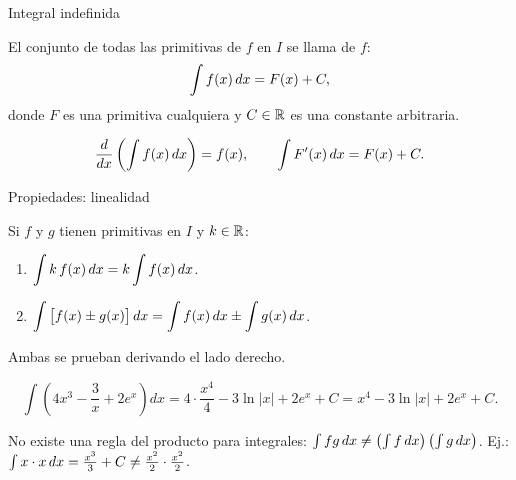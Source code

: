 \documentclass[10pt,aspectratio=169]{beamer}
\begin{document}
\begin{frame}{Integral indefinida}
  \begin{definicion}
    El conjunto de todas las primitivas de $f$ en $I$ se llama  de $f$:
    \[ \int f(x)\,dx = F(x)+C, \]
    donde $F$ es una primitiva cualquiera y $C\in\mathbb{R}$ es una constante arbitraria.
  \end{definicion}
  \begin{center}
  \end{center}
  \begin{proposicion}
    \[ \frac{d}{dx}\left(\int f(x)\,dx\right)=f(x),\qquad \int F'(x)\,dx=F(x)+C. \]
  \end{proposicion}
\end{frame}

\begin{frame}{Propiedades: linealidad}
  \begin{proposicion}
    Si $f$ y $g$ tienen primitivas en $I$ y $k\in\mathbb{R}$:
    \begin{enumerate}
      \item $\displaystyle\int k\,f(x)\,dx = k\int f(x)\,dx$.
      \item $\displaystyle\int \big[f(x)\pm g(x)\big]\,dx=\int f(x)\,dx\pm\int g(x)\,dx$.
    \end{enumerate}
  \end{proposicion}
  Ambas se prueban derivando el lado derecho.
  \begin{ejemplo}
    \[
      \int\left(4x^3-\frac{3}{x}+2e^x\right)dx
      = 4\cdot\frac{x^4}{4}-3\ln|x|+2e^x+C = x^4-3\ln|x|+2e^x+C.
    \]
  \end{ejemplo}
  \begin{observacion}
    \alert{No} existe una regla del producto para integrales:
    $\int f g\,dx \neq \left(\int f\,dx\right)\left(\int g\,dx\right)$.
    Ej.: $\int x\cdot x\,dx=\tfrac{x^3}{3}+C\neq \tfrac{x^2}{2}\cdot\tfrac{x^2}{2}$.
  \end{observacion}
\end{frame}
\end{document}
